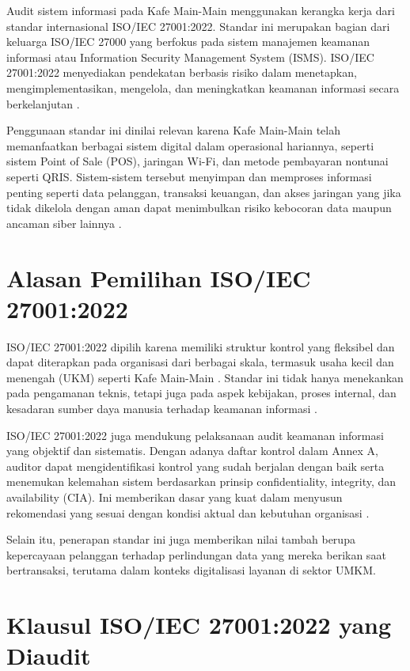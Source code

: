 \documentclass[12pt, a4paper]{report}
\begin{document}
Audit sistem informasi pada Kafe Main-Main menggunakan kerangka kerja dari standar internasional ISO/IEC 27001:2022. Standar ini merupakan bagian dari keluarga ISO/IEC 27000 yang berfokus pada sistem manajemen keamanan informasi atau Information Security Management System (ISMS). ISO/IEC 27001:2022 menyediakan pendekatan berbasis risiko dalam menetapkan, mengimplementasikan, mengelola, dan meningkatkan keamanan informasi secara berkelanjutan \cite{iso27001}.

Penggunaan standar ini dinilai relevan karena Kafe Main-Main telah memanfaatkan berbagai sistem digital dalam operasional hariannya, seperti sistem Point of Sale (POS), jaringan Wi-Fi, dan metode pembayaran nontunai seperti QRIS. Sistem-sistem tersebut menyimpan dan memproses informasi penting seperti data pelanggan, transaksi keuangan, dan akses jaringan yang jika tidak dikelola dengan aman dapat menimbulkan risiko kebocoran data maupun ancaman siber lainnya \cite{cafedigital}.

\section{Alasan Pemilihan ISO/IEC 27001:2022}

ISO/IEC 27001:2022 dipilih karena memiliki struktur kontrol yang fleksibel dan dapat diterapkan pada organisasi dari berbagai skala, termasuk usaha kecil dan menengah (UKM) seperti Kafe Main-Main \cite{rijal2022iso}. Standar ini tidak hanya menekankan pada pengamanan teknis, tetapi juga pada aspek kebijakan, proses internal, dan kesadaran sumber daya manusia terhadap keamanan informasi \cite{permatasari2023manajemen}.

ISO/IEC 27001:2022 juga mendukung pelaksanaan audit keamanan informasi yang objektif dan sistematis. Dengan adanya daftar kontrol dalam Annex A, auditor dapat mengidentifikasi kontrol yang sudah berjalan dengan baik serta menemukan kelemahan sistem berdasarkan prinsip confidentiality, integrity, dan availability (CIA). Ini memberikan dasar yang kuat dalam menyusun rekomendasi yang sesuai dengan kondisi aktual dan kebutuhan organisasi \cite{ratnasari2021penerapan}.

Selain itu, penerapan standar ini juga memberikan nilai tambah berupa kepercayaan pelanggan terhadap perlindungan data yang mereka berikan saat bertransaksi, terutama dalam konteks digitalisasi layanan di sektor UMKM.

\section{Klausul ISO/IEC 27001:2022 yang Diaudit}
\end{document}
